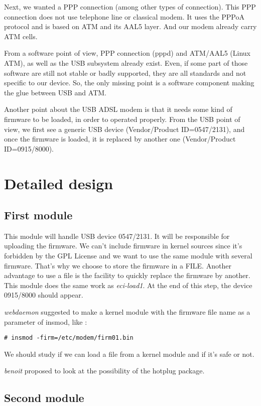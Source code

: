 \documentclass[a4paper,12pt]{article}
\begin{document}
Next, we wanted a PPP connection (among other types of connection).
This PPP connection does not use telephone line or classical modem. It
uses the PPPoA protocol and is based on ATM and its AAL5 layer. And
our modem already carry ATM cells.

From a software point of view, PPP connection (pppd) and ATM/AAL5
(Linux ATM), as well as the USB subsystem already exist. Even, if some
part of those software are still not stable or badly supported, they
are all standards and not specific to our device. So, the only missing
point is a software component making the glue between USB and ATM.

Another point about the USB ADSL modem is that it needs some kind of
firmware to be loaded, in order to operated properly. From the USB
point of view, we first see a generic USB device (Vendor/Product
ID=0547/2131), and once the firmware is loaded, it is replaced by
another one (Vendor/Product ID=0915/8000).

\section{Detailed design}

\subsection{First module}

This module will handle USB device 0547/2131. It will be responsible
for uploading the firmware. We can't include firmware in kernel
sources since it's forbidden by the GPL License and we want to use the
same module with several firmware.  That's why we choose to store the
firmware in a FILE. Another advantage to use a file is the facility to
quickly replace the firmware by another. This module does the same
work as \textit{eci-load1}. At the end of this step, the device
0915/8000 should appear.

\textit{webdaemon} suggested to make a kernel module with the firmware
file name as a parameter of insmod, like :
\begin{verbatim}
# insmod -firm=/etc/modem/firm01.bin
\end{verbatim}

We should study if we can load a file from a kernel module and if it's
safe or not.

\textit{benoit} proposed to look at the possibility of the hotplug
package.

\subsection{Second module}
\end{document}

